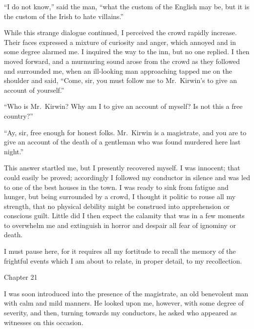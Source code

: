\documentclass[12pt,openright]{book}
\begin{document}
“I do not know,” said the man, “what the custom of the English may be, but it is the custom of the Irish to hate villains.”

While this strange dialogue continued, I perceived the crowd rapidly increase. Their faces expressed a mixture of curiosity and anger, which annoyed and in some degree alarmed me. I inquired the way to the inn, but no one replied. I then moved forward, and a murmuring sound arose from the crowd as they followed and surrounded me, when an ill-looking man approaching tapped me on the shoulder and said, “Come, sir, you must follow me to Mr. Kirwin’s to give an account of yourself.”

“Who is Mr. Kirwin? Why am I to give an account of myself? Is not this a free country?”

“Ay, sir, free enough for honest folks. Mr. Kirwin is a magistrate, and you are to give an account of the death of a gentleman who was found murdered here last night.”

This answer startled me, but I presently recovered myself. I was innocent; that could easily be proved; accordingly I followed my conductor in silence and was led to one of the best houses in the town. I was ready to sink from fatigue and hunger, but being surrounded by a crowd, I thought it politic to rouse all my strength, that no physical debility might be construed into apprehension or conscious guilt. Little did I then expect the calamity that was in a few moments to overwhelm me and extinguish in horror and despair all fear of ignominy or death.

I must pause here, for it requires all my fortitude to recall the memory of the frightful events which I am about to relate, in proper detail, to my recollection.

Chapter 21

I was soon introduced into the presence of the magistrate, an old benevolent man with calm and mild manners. He looked upon me, however, with some degree of severity, and then, turning towards my conductors, he asked who appeared as witnesses on this occasion.
\end{document}
